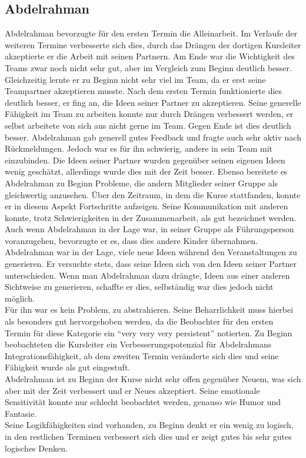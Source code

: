 \subsection*{Abdelrahman}
Abdelrahman bevorzugte für den ersten Termin die Alleinarbeit. Im Verlaufe der weiteren Termine verbesserte sich dies, durch das Drängen der dortigen Kursleiter akzeptierte er die Arbeit mit seinen Partnern. Am Ende war die Wichtigkeit des Teams zwar noch nicht sehr gut, aber im Vergleich zum Beginn deutlich besser. Gleichzeitig lernte er zu Beginn nicht sehr viel im Team, da er erst seine Teampartner akzeptieren musste. Nach dem ersten Termin funktionierte dies deutlich besser, er fing an, die Ideen seiner Partner zu akzeptieren. Seine generelle Fähigkeit im Team zu arbeiten konnte nur durch Drängen verbessert werden, er selbst arbeitete von sich aus nicht gerne im Team. Gegen Ende ist dies deutlich besser. Abdelrahman gab generell gutes Feedback und fragte auch sehr aktiv nach Rückmeldungen. Jedoch war es für ihn schwierig, andere in sein Team mit einzubinden. Die Ideen seiner Partner wurden gegenüber seinen eigenen Ideen wenig geschätzt, allerdings wurde dies mit der Zeit besser. Ebenso bereitete es Abdelrahman zu Beginn Probleme, die andern Mitglieder seiner Gruppe als gleichwertig anzusehen. Über den Zeitraum, in dem die Kurse stattfanden, konnte er in diesem Aspekt Fortschritte aufzeigen. Seine Kommunikation mit anderen konnte, trotz Schwierigkeiten in der Zusammenarbeit, als gut bezeichnet werden. Auch wenn Abdelrahman in der Lage war, in seiner Gruppe als Führungsperson voranzugehen, bevorzugte er es, dass dies andere Kinder übernahmen.\\

Abdelrahman war in der Lage, viele neue Ideen während den Veranstaltungen zu generieren. Er versuchte stets, dass seine Ideen sich von den Ideen seiner Partner unterschieden. Wenn man Abdelrahman dazu drängte, Ideen aus einer anderen Sichtweise zu generieren, schaffte er dies, selbständig war dies jedoch nicht möglich.\\
Für ihn war es kein Problem, zu abstrahieren. Seine Beharrlichkeit muss hierbei als besonders gut hervorgehoben werden, da die Beobachter für den ersten Termin für diese Kategorie ein "`very very very persistent"' notierten. Zu Beginn beobachteten die Kursleiter ein Verbesserungspotenzial für Abdelrahmans Integrationsfähigkeit, ab dem zweiten Termin veränderte sich dies und seine Fähigkeit wurde als gut eingestuft.\\
Abdelrahman ist zu Beginn der Kurse nicht sehr offen gegenüber Neuem, was sich aber mit der Zeit verbessert und er Neues akzeptiert. Seine emotionale Sensitivität konnte nur schlecht beobachtet werden, genauso wie Humor und Fantasie.\\
Seine Logikfähigkeiten sind vorhanden, zu Beginn denkt er ein wenig zu logisch, in den restlichen Terminen verbessert sich dies und er zeigt gutes bis sehr gutes logisches Denken.\\ 

